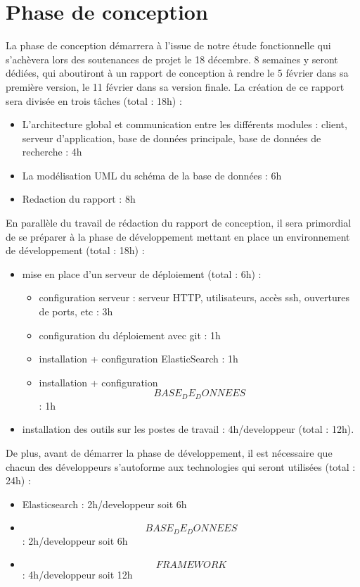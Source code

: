 \section{Phase de conception}

    La phase de conception démarrera à l'issue de notre étude fonctionnelle qui s'achèvera lors des soutenances de projet le 18 décembre.  8 semaines y seront dédiées, qui aboutiront à un rapport de conception à rendre le 5 février dans sa première version, le 11 février dans sa version finale. La création de ce rapport sera divisée en trois tâches (total : 18h) :
\begin{itemize}
\item L'architecture global et communication entre les différents modules : client, serveur d'application, base de données principale, base de données de recherche : 4h
\item La modélisation UML du schéma de la base de données : 6h
\item Redaction du rapport : 8h
\end{itemize}

    En parallèle du travail de rédaction du rapport de conception, il sera primordial de se préparer à la phase de développement mettant en place un environnement de développement (total : 18h) :
\begin{itemize}
\item mise en place d'un serveur de déploiement (total : 6h) :
    \begin{itemize}
    \item configuration serveur : serveur HTTP, utilisateurs, accès ssh, ouvertures de ports, etc : 3h
    \item configuration du déploiement avec git : 1h
    \item installation + configuration ElasticSearch : 1h
    \item installation + configuration \[BASE_DE_DONNEES\] : 1h
    \end{itemize}
\item installation des outils sur les postes de travail : 4h/developpeur (total : 12h).
\end{itemize}

De plus, avant de démarrer la phase de développement, il est nécessaire que chacun des développeurs s'autoforme aux technologies qui seront utilisées (total : 24h) :
\begin{itemize}
\item Elasticsearch : 2h/developpeur soit 6h
\item \[BASE_DE_DONNEES\] : 2h/developpeur soit 6h
\item \[FRAMEWORK\] : 4h/developpeur soit 12h
\end{itemize}

